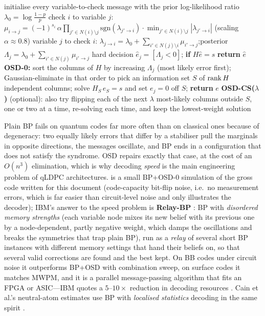 \begin{algorithm}[H]
\caption{BP+OSD decoding (one check type; $H$ is $m\times n$, syndrome $s$, prior error rate $p$)}\label{alg:bposd}
\begin{algorithmic}[1]
\State initialise every variable-to-check message with the prior log-likelihood ratio $\lambda_0=\log\frac{1-p}{p}$
  \State check $i$ to variable $j$: $\mu_{i\to j}=(-1)^{s_i}\,\alpha\prod_{j'\in N(i)\setminus j}\mathrm{sgn}(\lambda_{j'\to i})\cdot\min_{j'\in N(i)\setminus j}|\lambda_{j'\to i}|$ (scaling $\alpha\approx0.8$)
  \State variable $j$ to check $i$: $\lambda_{j\to i}=\lambda_0+\sum_{i'\in N(j)\setminus i}\mu_{i'\to j}$;\quad posterior $\Lambda_j=\lambda_0+\sum_{i'\in N(j)}\mu_{i'\to j}$
  \State hard decision $\hat e_j=[\Lambda_j<0]$; \textbf{if} $H\hat e=s$ \textbf{return} $\hat e$
\EndFor
\State \textbf{OSD-0:} sort the columns of $H$ by increasing $\Lambda_j$ (most likely error first); Gaussian-eliminate in that order to pick an information set $S$ of $\operatorname{rank} H$ independent columns; solve $H_S\,e_S=s$ and set $e_j=0$ off $S$; \textbf{return} $e$
\State \textbf{OSD-CS($\lambda$)} (optional): also try flipping each of the next $\lambda$ most-likely columns outside $S$, one or two at a time, re-solving each time, and keep the lowest-weight solution
\end{algorithmic}
\end{algorithm}

Plain BP fails on quantum codes far more often than on classical ones because of degeneracy: two equally likely errors that differ by a stabiliser pull the marginals in opposite directions, the messages oscillate, and BP ends in a configuration that does not satisfy the syndrome. OSD repairs exactly that case, at the cost of an $O(n^3)$ elimination, which is why decoding \emph{speed} is the main engineering problem of qLDPC architectures.  is a small BP+OSD-0 simulation of the gross code written for this document (code-capacity bit-flip noise, i.e.\ no measurement errors, which is far easier than circuit-level noise and only illustrates the decoder); IBM's answer to the speed problem is \textbf{Relay-BP} \cite{mueller25relaybp}: BP with \emph{disordered memory strengths} (each variable node mixes its new belief with its previous one by a node-dependent, partly negative weight, which damps the oscillations and breaks the symmetries that trap plain BP), run as a \emph{relay} of several short BP instances with different memory settings that hand their beliefs on, so that several valid corrections are found and the best kept. On BB codes under circuit noise it outperforms BP+OSD with combination sweep, on surface codes it matches MWPM, and it is a parallel message-passing algorithm that fits an FPGA or ASIC---IBM quotes a $5$--$10\times$ reduction in decoding resources \cite{ibm-blog25}. Cain et al.'s neutral-atom estimates use BP with \emph{localised statistics} decoding in the same spirit \cite{cain26}.

